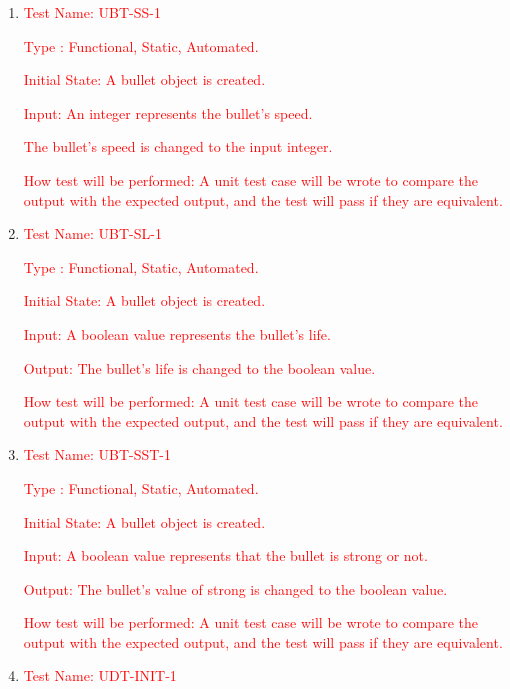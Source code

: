 \documentclass[12pt, titlepage]{article}
\begin{document}
\begin{enumerate}

\item{\textcolor{red}{Test Name: UBT-SS-1}}

\textcolor{red}{Type : Functional, Static, Automated.}

\textcolor{red}{Initial State: A bullet object is created.}

\textcolor{red}{Input: An integer represents the bullet's speed.}

\textcolor{red}{The bullet's speed is changed to the input integer.}

\textcolor{red}{How test will be performed: A unit test case will be wrote to compare the output with the expected output, and the test will pass if they are equivalent.}\\

\item{\textcolor{red}{Test Name: UBT-SL-1}}

\textcolor{red}{Type : Functional, Static, Automated.}

\textcolor{red}{Initial State: A bullet object is created.}

\textcolor{red}{Input: A boolean value represents the bullet's life.}

\textcolor{red}{Output: The bullet's life is changed to the boolean value.}

\textcolor{red}{How test will be performed: A unit test case will be wrote to compare the output with the expected output, and the test will pass if they are equivalent.}\\

\item{\textcolor{red}{Test Name: UBT-SST-1}}

\textcolor{red}{Type : Functional, Static, Automated.}

\textcolor{red}{Initial State: A bullet object is created.}

\textcolor{red}{Input: A boolean value represents that the bullet is strong or not.}

\textcolor{red}{Output: The bullet's value of strong is changed to the boolean value.}

\textcolor{red}{How test will be performed: A unit test case will be wrote to compare the output with the expected output, and the test will pass if they are equivalent.}\\

\item{\textcolor{red}{Test Name: UDT-INIT-1}}


\end{enumerate}
\end{document}
